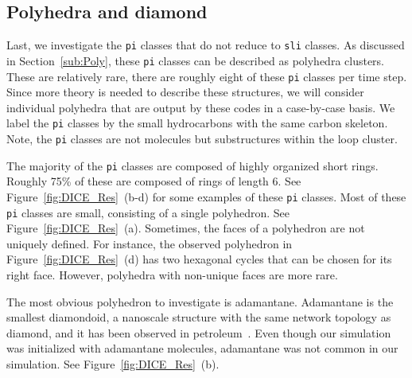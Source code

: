 \documentclass[fleqn,11pt]{article}
\begin{document}
\subsection{Polyhedra and diamond} 
Last, we investigate the {\tt pi} classes that do not reduce to {\tt sli} classes. As discussed in Section~\ref{sub:Poly}, these {\tt pi} classes can be described as polyhedra clusters. These are relatively rare, there are roughly eight of these {\tt pi} classes per time step. Since more theory is needed to describe these structures, we will consider individual polyhedra that are output by these codes in a case-by-case basis.
We label the {\tt pi} classes by the small hydrocarbons with the same carbon skeleton. Note, the {\tt pi} classes are not molecules but substructures within the loop cluster.

The majority of the {\tt pi} classes are composed of highly organized short rings. 
Roughly 75\% of these are composed of rings of length 6.
See Figure~\ref{fig:DICE_Res}~(b-d) for some examples of these {\tt pi} classes. 
Most of these {\tt pi} classes are small, consisting of a single polyhedron. See Figure~\ref{fig:DICE_Res}~(a). 
Sometimes, the faces of a polyhedron are not uniquely defined. For instance, the observed polyhedron in Figure~\ref{fig:DICE_Res}~(d) has two hexagonal cycles that can be chosen for its right face. However, polyhedra with non-unique faces are more rare.


The most obvious polyhedron to investigate is adamantane. 
Adamantane is the smallest diamondoid, a nanoscale structure with the same network topology as diamond, and it has been observed in petroleum~\cite{fangOrigin2013}.
Even though our simulation was initialized with adamantane molecules, adamantane was not common in our simulation. See Figure~\ref{fig:DICE_Res}~(b). 
 
\end{document}
